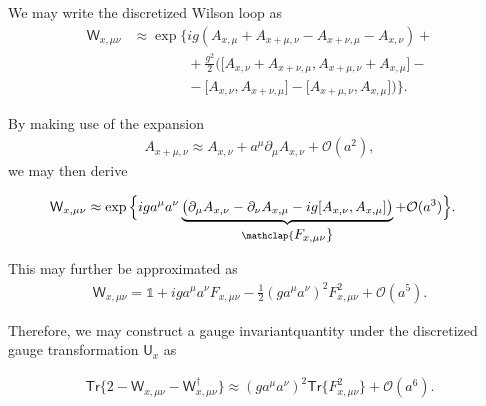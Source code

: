\begin{note}
We may write the discretized Wilson loop as
\begin{align*}
    \textsf{W}_{x,\mu\nu}&\approx\exp\Bigg\{ig(A_{x,\mu}+A_{x+\mu,\nu}-A_{x+\nu,\mu}-A_{x,\nu})+\\
    &\phantom{\approx\exp\Bigg\{}+\frac{g^2}{2}\Big(\big[A_{x,\nu}+A_{x+\nu,\mu},A_{x+\mu,\nu}+A_{x,\mu}\big]-\\
    &\phantom{\approx\exp\Bigg\{}-\big[A_{x,\nu},A_{x+\nu,\mu}\big]-\big[A_{x+\mu,\nu},A_{x,\mu}\big]\Big)\Bigg\}.
\end{align*}

By making use of the expansion 
\begin{align*}
    A_{x+\mu,\nu}\approx A_{x,\nu}+a^\mu\partial_\mu A_{x,\nu}+\mathcal{O}(a^2),   
\end{align*}
we may then derive
\begin{fullwidth}
\begin{align*}
     \textsf{W}_{x,\mu\nu}&\approx\exp\Big\{iga^\mu a^\nu\underbrace{\big(\partial_\mu A_{x,\nu}-\partial_\nu A_{x,\mu}-ig[A_{x,\nu},A_{x,\mu}]\big)}_{\mathclap{\textstyle F_{x,\mu\nu}}}+\mathcal{O}(a^3)\Big\}.
\end{align*}
\end{fullwidth}
This may further be approximated as
\begin{align*}
    \textsf{W}_{x,\mu\nu}=\mathds{1}+ig a^\mu a^\nu F_{x,\mu \nu}-\frac{1}{2}(ga^\mu a^\nu)^2 F_{x,\mu \nu}^2+\mathcal{O}(a^5).
\end{align*}
\end{note}
Therefore, we may construct a gauge invariantquantity under the discretized gauge transformation $\textsf{U}_x$ as
\begin{fullwidth}
\begin{align}\label{latt8}
    \textsf{Tr}\big\{2-\textsf{W}_{x, \mu \nu}-\textsf{W}_{x, \mu \nu}^{\dagger}\big\} \approx\left(g a^{\mu} a^{\nu}\right)^{2} \textsf{Tr}\big\{F_{x,\mu \nu}^{2}\big\}+\mathcal{O}(a^{6}).
\end{align}
\end{fullwidth}
